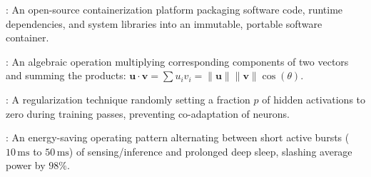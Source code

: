 \begin{description}[leftmargin=!,labelwidth=4.5cm,itemsep=1.5ex]
\item[\textbf{Docker}\hfill \textnormal{\sffamily\scriptsize\color{keyideablue}[MLOps]}]: An open-source containerization platform packaging software code, runtime dependencies, and system libraries into an immutable, portable software container.
\item[\textbf{Dot Product}\hfill \textnormal{\sffamily\scriptsize\color{keyideablue}[Mathematics]}]: An algebraic operation multiplying corresponding components of two vectors and summing the products: $\mathbf{u} \cdot \mathbf{v} = \sum u_i v_i = \|\mathbf{u}\| \|\mathbf{v}\| \cos(\theta)$.
\item[\textbf{Dropout}\hfill \textnormal{\sffamily\scriptsize\color{keyideablue}[Deep Learning]}]: A regularization technique randomly setting a fraction $p$ of hidden activations to zero during training passes, preventing co-adaptation of neurons.
\item[\textbf{Duty Cycling}\hfill \textnormal{\sffamily\scriptsize\color{keyideablue}[IoT \& Hardware]}]: An energy-saving operating pattern alternating between short active bursts ($10\,\text{ms}$ to $50\,\text{ms}$) of sensing/inference and prolonged deep sleep, slashing average power by $98\%$.
\end{description}

